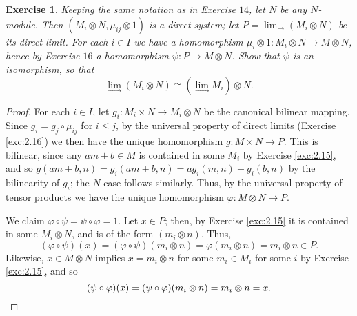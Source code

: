 \documentclass[12pt,letterpaper]{article}
\newtheorem{problem}{Exercise}[section]
\theoremstyle{definition}
\theoremstyle{remark}
\numberwithin{figure}{problem}
\numberwithin{equation}{section}
\begin{document}
\begin{problem}\label{exc:2.20}
  Keeping the same notation as in Exercise \href{exc:2.14}{$14$}, let $N$ be
  any $N$-module.
  Then $(M_i \otimes N, \mu_{ij} \otimes 1)$ is a direct system; let
  $P = \displaystyle\lim_{\longrightarrow}(M_i \otimes N)$ be its direct limit.
  For each $i \in I$ we have a homomorphism
  $\mu_i \otimes 1\colon M_i \otimes N \to M \otimes N$, hence by Exercise
  \href{exc:2.16}{$16$} a homomorphism $\psi\colon P \to M \otimes N$.
  Show that $\psi$ is an isomorphism, so that
  \begin{equation*}
    \lim_{\longrightarrow} (M_i \otimes N) \cong \left( \lim_{\longrightarrow} M_i \right) \otimes N.
  \end{equation*}
\end{problem}
\begin{proof}
  For each $i \in I$, let $g_i\colon M_i \times N \to M_i \otimes N$ be the
  canonical bilinear mapping.
  Since $g_i = g_j \circ \mu_{ij}$ for $i \le j$, by the universal property of
  direct limits (Exercise \ref{exc:2.16}) we then have the unique homomorphism
  $g\colon M \times N \to P$.
  This is bilinear, since any $am+b \in M$ is contained in some $M_i$ by
  Exercise \ref{exc:2.15}, and so
  $g(am+b,n) = g_i(am+b,n) = ag_i(m,n) + g_i(b,n)$ by the bilinearity of $g_i$;
  the $N$ case follows similarly.
  Thus, by the universal property of tensor products we have the unique
  homomorphism $\varphi\colon M \otimes N \to P$.
  \par We claim $\varphi \circ \psi = \psi \circ \varphi = 1$.
  Let $x \in P$; then, by Exercise \ref{exc:2.15} it is contained in some
  $M_i \otimes N$, and is of the form $(m_i \otimes n)$.
  Thus,
  \begin{equation*}
    (\varphi \circ \psi)(x) = (\varphi \circ \psi)(m_i \otimes n)
    = \varphi(m_i \otimes n) = m_i \otimes n \in P.
  \end{equation*}
  Likewise, $x \in M \otimes N$ implies $x = m_i \otimes n$ for some $m_i \in M_i$
  for some $i$ by Exercise \ref{exc:2.15}, and so
  \begin{equation*}
    (\psi \circ \varphi)(x) = (\psi \circ \varphi)(m_i \otimes n) = m_i \otimes
    n = x.\qedhere
  \end{equation*}
\end{proof}
\end{document}
